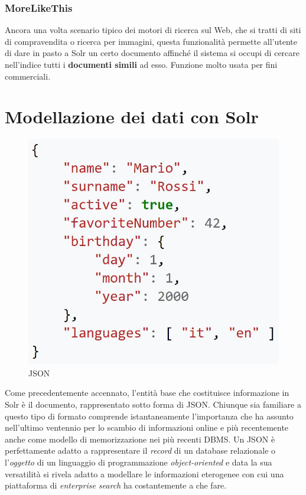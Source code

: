 \subsubsection{MoreLikeThis}

Ancora una volta scenario tipico dei motori di ricerca sul Web, che si tratti di siti di compravendita o ricerca per immagini, questa funzionalità permette all’utente di dare in pasto a Solr un certo documento affinché il sistema si occupi di cercare nell'indice tutti i \textbf{documenti simili} ad esso. Funzione molto usata per fini commerciali.




\section{Modellazione dei dati con Solr}

\begin{figure}
  \includegraphics[scale=0.32]{../images/02_3_json}
  \caption[Esempio di JSON]{JSON}
  \label{fig:jsonexample}
\end{figure} 

Come precedentemente accennato, l’entità base che costituisce informazione in Solr è il documento, rappresentato sotto forma di JSON. Chiunque sia familiare a questo tipo di formato comprende istantaneamente l’importanza che ha assunto nell’ultimo ventennio per lo scambio di informazioni online e più recentemente anche come modello di memorizzazione nei più recenti DBMS. Un JSON è perfettamente adatto a rappresentare il \textit{record} di un database relazionale o l’\textit{oggetto} di un linguaggio di programmazione \textit{object-oriented} e data la sua versatilità si rivela adatto a modellare le informazioni eterogenee con cui una piattaforma di\textit{ enterprise search} ha costantemente a che fare. 



